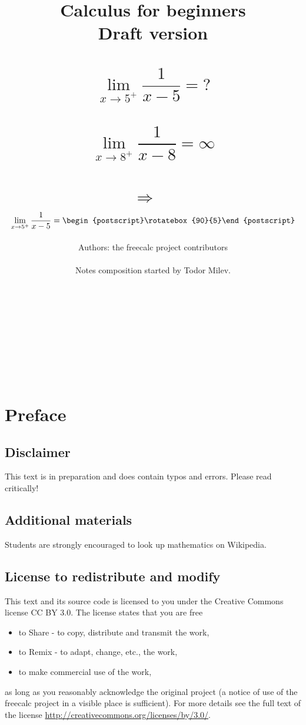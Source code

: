 \documentclass[12pt]{book}
\author{Authors: the freecalc project contributors \\~\\ Notes composition started by Todor Milev.}
\title{Calculus for beginners \\Draft version \\ ~\\
\[
\lim\limits_{x\to 5^+}\frac{1}{x-5}= ?
\]
~\\
\[
\lim\limits_{x\to 8^+}\frac{1}{x-8}=\infty
\]
~\\
$\Rightarrow$
~\\
\[
\lim\limits_{x\to 5^+}\frac{1}{x-5}= \begin{postscript}\rotatebox{90}{5}\end{postscript}
\]
}
\begin{document}
\maketitle

{
~

\bigskip

~

\bigskip

~

\bigskip

~

\bigskip

\begin{center}
\Huge{\color{red}}
\end{center}
} %



\chapter*{Preface}


\section*{Disclaimer}
This text is in preparation and does contain typos and errors. Please read critically!

\section*{Additional materials} Students are strongly encouraged to look up mathematics on Wikipedia.


\section*{License to redistribute and modify} This text and its source code is licensed to you under the Creative Commons license CC BY 3.0. The license states that you are free
\begin{itemize}
\item to Share - to copy, distribute and transmit the work,
\item to Remix - to adapt, change, etc., the work,
\item to make commercial use of the work,
\end{itemize}
as long as you reasonably acknowledge the original project (a notice of use of the freecalc project in a visible place is sufficient). For more details see the full text of the license \url{http://creativecommons.org/licenses/by/3.0/}.
\end{document}
